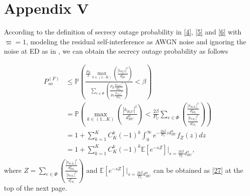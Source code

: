 \documentclass[10pt]{IEEEtran}
\begin{document}
\section*{Appendix V}
According to the definition of secrecy outage probability in \eqref{4}, \eqref{5} and \eqref{6} with $\varpi = 1$, modeling the residual self-interference as AWGN noise \cite{B.D14,M.J11} and ignoring the noise at ED as in \cite{X.Z13,C.W15,X.Z131}, we can obtain the secrecy outage probability as follows

\begin{equation}\label{26}
\begin{split}
P^{(F)}_{so} &\leq \mathbb{P}\left(\frac{\frac{P_B}{2}\underset{k\in (1...K)}{\max}\left(\frac{|h_{B_kU}|^2}{d^\alpha_{BU}}\right)}{\underset{e\in \Phi}{\sum}\left(\frac{P_B\frac{|h_{B_*E_e}|^2}{d^\alpha_{BE_e}}}{P_U\frac{|h_{UE_e}|^2}{d^\alpha_{UE_e}}}\right)}<\beta\right)\\
& = \mathbb{P}\left(\underset{k\in (1...K)}{\max}\left(\frac{|h_{B_kU}|^2}{d_{BU}^\alpha}\right)<\frac{2\beta}{P_U}\underset{e\in \Phi}{\sum}\left(\frac{\frac{|h_{B_*E_e}|^2}{d^\alpha_{BE_e}}}{\frac{|h_{UE_e}|^2}{d^\alpha_{UE_e}}}\right)\right)\\
& = 1+\sum^K_{k=1}C^k_K(-1)^k\int_0^\infty e^{-\frac{2k\beta}{P_U} zd^\alpha_{BU}}f_Z(z)dz\\
& = 1+\sum^K_{k=1}C^k_K(-1)^k\mathbb{E}\left[e^{-sZ}\right]|_{s=\frac{2k\beta}{P_U} d^\alpha_{BU}},
\end{split}
\end{equation}
where $Z = \underset{e\in \Phi}{\sum}\left(\frac{\frac{|h_{B_*E_e}|^2}{d^\alpha_{BE_e}}}{\frac{|h_{UE_e}|^2}{d^\alpha_{UE_e}}}\right)$ and $\mathbb{E}\left[e^{-sZ}\right]|_{s=\frac{2k\beta}{P_U} d^\alpha_{BU}}$ can be obtained as \eqref{27} at the top of the next page.
\end{document}
